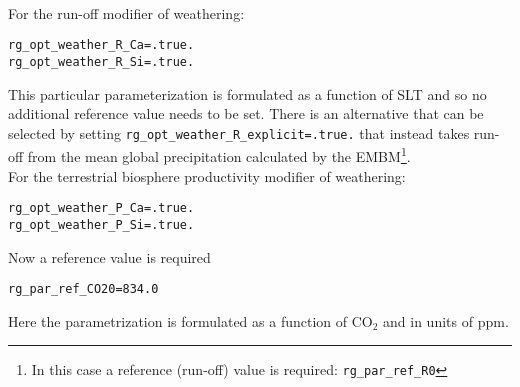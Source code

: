 \documentclass[10pt,twoside]{article}
\begin{document}
\begin{compactitem}
                \\For the run-off modifier of weathering:
\vspace{-5pt}\begin{verbatim}
rg_opt_weather_R_Ca=.true.
rg_opt_weather_R_Si=.true.
                \end{verbatim}\vspace{-5pt}
                This particular parameterization is formulated as a function of SLT and so no additional reference value needs to be set. There is an alternative that can be selected by setting \texttt{rg\_opt\_weather\_R\_explicit=.true.} that instead takes run-off from the mean global precipitation calculated by the EMBM\footnote{In this case a reference (run-off) value is required: \texttt{rg\_par\_ref\_R0}}.
                \\For the terrestrial biosphere productivity modifier of weathering:
\vspace{-5pt}\begin{verbatim}
rg_opt_weather_P_Ca=.true.
rg_opt_weather_P_Si=.true.
                \end{verbatim}\vspace{-5pt}
                Now a reference value is required
\vspace{-5pt}\begin{verbatim}
rg_par_ref_CO20=834.0
                \end{verbatim}\vspace{-5pt}
                                Here the parametrization is formulated as a function of CO$_{2}$ and in units of ppm.
                
                
                

\end{compactitem}
\end{document}
